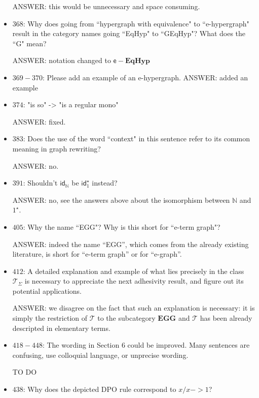 \documentclass[english,11pt,a4paper]{article}
\begin{document}
\begin{itemize}
ANSWER: this would be unnecessary and space consuming.

\item $368$: Why does going from ``hypergraph with equivalence" to ``e-hypergraph" result in the category names going ``EqHyp" to ``GEqHyp"? What does the ``G" mean?

ANSWER: notation changed to $\mathsf{e}-\mathbf{EqHyp}$


\item $369-370$: Please add an example of an e-hypergraph.
ANSWER: added an example


\item $374$: "is so" -> "is a regular mono"

ANSWER: fixed.

\item $383$: Does the use of the word ``context" in this sentence refer to its common meaning in graph rewriting?

ANSWER: no.


\item $391$: Shouldn't $\mathsf{id}_\mathbb{N}$ be $\mathsf{id}^\star_1$ instead? 

ANSWER: no, see the answers above about the isomorphism between $\mathbb{N}$ and $1^\star$.

\item $405$: Why the name ``EGG"? Why is this short for ``e-term graph"?

ANSWER: indeed the name ``EGG'', which comes from the already existing literature, is short for ``e-term graph'' or for ``e-graph''.

\item $412$: A detailed explanation and example of what lies precisely in the class $\mathcal{T}_\Sigma$ is necessary to appreciate the next adhesivity result, and figure out its potential applications.

ANSWER: we disagree on the fact that such an explanation is necessary: it is simply the restriction of $\mathcal{T}$ to the subcategory $\mathbf{EGG}$ and $\mathcal{T}$ has been already descripted in elementary terms.

\item $418-448$: The wording in Section 6 could be improved. Many sentences are confusing, use colloquial language, or unprecise wording.

TO DO

\item $438$: Why does the depicted DPO rule correspond to $x/x -> 1$?


\end{itemize}
\end{document}
